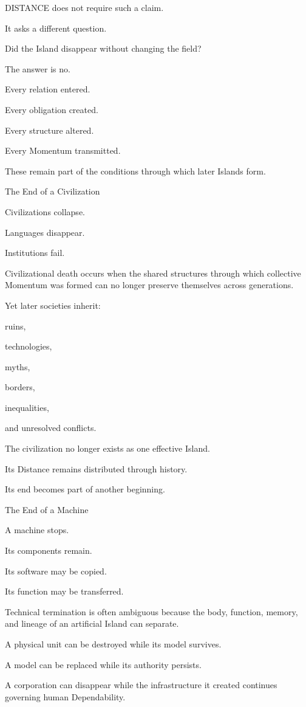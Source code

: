 DISTANCE does not require such a claim.

It asks a different question.

Did the Island disappear without changing the field?

The answer is no.

Every relation entered.

Every obligation created.

Every structure altered.

Every Momentum transmitted.

These remain part of the conditions through which later Islands form.

The End of a Civilization

Civilizations collapse.

Languages disappear.

Institutions fail.

Civilizational death occurs when the shared structures through which collective Momentum was formed can no longer preserve themselves across generations.

Yet later societies inherit:

ruins,

technologies,

myths,

borders,

inequalities,

and unresolved conflicts.

The civilization no longer exists as one effective Island.

Its Distance remains distributed through history.

Its end becomes part of another beginning.

The End of a Machine

A machine stops.

Its components remain.

Its software may be copied.

Its function may be transferred.

Technical termination is often ambiguous because the body, function, memory, and lineage of an artificial Island can separate.

A physical unit can be destroyed while its model survives.

A model can be replaced while its authority persists.

A corporation can disappear while the infrastructure it created continues governing human Dependability.


